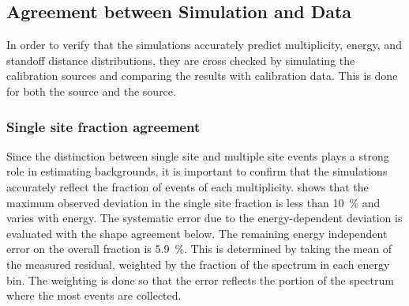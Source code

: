 \documentclass[herrin-thesis.tex]{subfiles}
\begin{document}
\subsection{Agreement between Simulation and Data}
In order to verify that the simulations accurately predict multiplicity, energy, and standoff distance distributions, they are cross checked by simulating the calibration sources and comparing the results with calibration data. This is done for both the  source and the  source.

\subsubsection{Single site fraction agreement}
\label{sec:analysis_ss_frac_agreement}
Since the distinction between single site and multiple site events plays a strong role in estimating backgrounds, it is important to confirm that the simulations accurately reflect the fraction of events of each multiplicity.  shows that the maximum observed deviation in the single site fraction is less than \SI{10}{\percent} and varies with energy. The systematic error due to the energy-dependent deviation is evaluated with the shape agreement below. The remaining energy independent error on the overall fraction is \SI{5.9}{\percent}. This is determined by taking the mean of the measured residual, weighted by the fraction of the \twonu{} spectrum in each energy bin. The weighting is done so that the error reflects the portion of the spectrum where the most events are collected.
\end{document}
